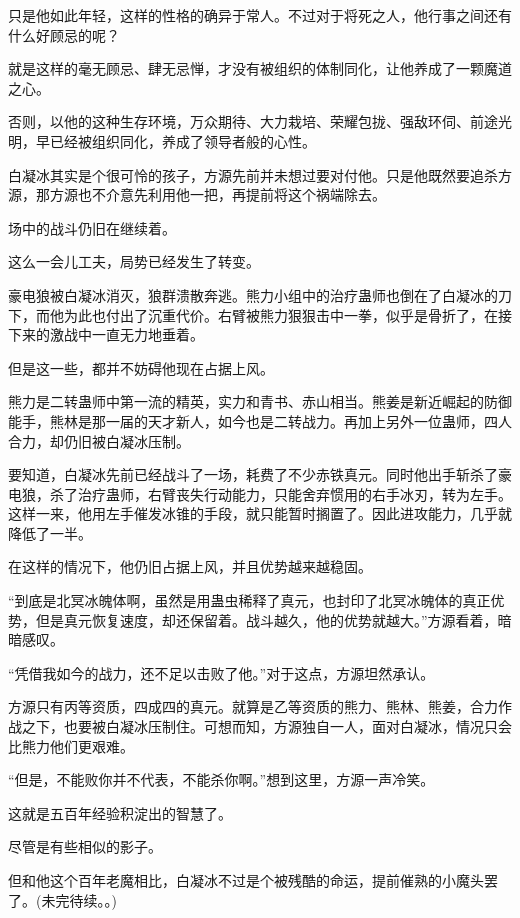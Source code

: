 \begin{this_body}
只是他如此年轻，这样的性格的确异于常人。不过对于将死之人，他行事之间还有什么好顾忌的呢？

就是这样的毫无顾忌、肆无忌惮，才没有被组织的体制同化，让他养成了一颗魔道之心。

否则，以他的这种生存环境，万众期待、大力栽培、荣耀包拢、强敌环伺、前途光明，早已经被组织同化，养成了领导者般的心性。

白凝冰其实是个很可怜的孩子，方源先前并未想过要对付他。只是他既然要追杀方源，那方源也不介意先利用他一把，再提前将这个祸端除去。

场中的战斗仍旧在继续着。

这么一会儿工夫，局势已经发生了转变。

豪电狼被白凝冰消灭，狼群溃散奔逃。熊力小组中的治疗蛊师也倒在了白凝冰的刀下，而他为此也付出了沉重代价。右臂被熊力狠狠击中一拳，似乎是骨折了，在接下来的激战中一直无力地垂着。

但是这一些，都并不妨碍他现在占据上风。

熊力是二转蛊师中第一流的精英，实力和青书、赤山相当。熊姜是新近崛起的防御能手，熊林是那一届的天才新人，如今也是二转战力。再加上另外一位蛊师，四人合力，却仍旧被白凝冰压制。

要知道，白凝冰先前已经战斗了一场，耗费了不少赤铁真元。同时他出手斩杀了豪电狼，杀了治疗蛊师，右臂丧失行动能力，只能舍弃惯用的右手冰刃，转为左手。这样一来，他用左手催发冰锥的手段，就只能暂时搁置了。因此进攻能力，几乎就降低了一半。

在这样的情况下，他仍旧占据上风，并且优势越来越稳固。

“到底是北冥冰魄体啊，虽然是用蛊虫稀释了真元，也封印了北冥冰魄体的真正优势，但是真元恢复速度，却还保留着。战斗越久，他的优势就越大。”方源看着，暗暗感叹。

“凭借我如今的战力，还不足以击败了他。”对于这点，方源坦然承认。

方源只有丙等资质，四成四的真元。就算是乙等资质的熊力、熊林、熊姜，合力作战之下，也要被白凝冰压制住。可想而知，方源独自一人，面对白凝冰，情况只会比熊力他们更艰难。

“但是，不能败你并不代表，不能杀你啊。”想到这里，方源一声冷笑。

这就是五百年经验积淀出的智慧了。

尽管是有些相似的影子。

但和他这个百年老魔相比，白凝冰不过是个被残酷的命运，提前催熟的小魔头罢了。(未完待续。。)

\end{this_body}

